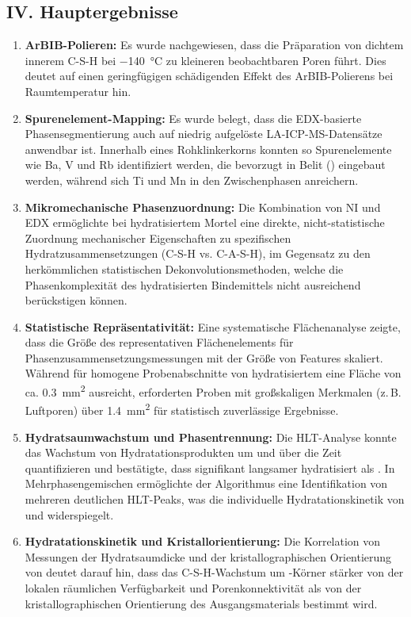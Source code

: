 \documentclass[11pt, a4paper]{article}
\begin{document}
\subsection*{IV. Hauptergebnisse}

\begin{enumerate}[label=\textbf{\arabic*.}, leftmargin=1.5cm, labelsep=0.5cm, itemsep=0.5em, resume]
    \item \textbf{ArBIB-Polieren:} Es wurde nachgewiesen, dass die Präparation von dichtem innerem C-S-H bei \qty{-140}{\celsius} zu kleineren beobachtbaren Poren führt.
    Dies deutet auf einen geringfügigen schädigenden Effekt des ArBIB-Polierens bei Raumtemperatur hin.
    \item \textbf{Spurenelement-Mapping:} Es wurde belegt, dass die EDX-basierte Phasensegmentierung auch auf niedrig aufgelöste LA-ICP-MS-Datensätze anwendbar ist.
    Innerhalb eines Rohklinkerkorns konnten so Spurenelemente wie Ba, V und Rb identifiziert werden, die bevorzugt in Belit () eingebaut werden, während sich Ti und Mn in den Zwischenphasen anreichern.
    \newpage
    \item \textbf{Mikromechanische Phasenzuordnung:} Die Kombination von NI und EDX ermöglichte bei hydratisiertem Mortel eine direkte, nicht-statistische Zuordnung mechanischer Eigenschaften zu spezifischen Hydratzusammensetzungen (C-S-H vs. C-A-S-H), im Gegensatz zu den herkömmlichen statistischen Dekonvolutionsmethoden, welche die Phasenkomplexität des hydratisierten Bindemittels nicht ausreichend berückstigen können.
    \item \textbf{Statistische Repräsentativität:} Eine systematische Flächenanalyse zeigte, dass die Größe des representativen Flächenelements für Phasenzusammensetzungsmessungen mit der Größe von Features skaliert. Während für homogene Probenabschnitte von hydratisiertem  eine Fläche von ca. \qty{0,3}{\milli\meter\squared} ausreicht, erforderten Proben mit großskaligen Merkmalen (z.\,B. Luftporen) über \qty{1,4}{\milli\meter\squared} für statistisch zuverlässige Ergebnisse.
    \item \textbf{Hydratsaumwachstum und Phasentrennung:} Die HLT-Analyse konnte das Wachstum von Hydratationsprodukten um  und  über die Zeit quantifizieren und bestätigte, dass  signifikant langsamer hydratisiert als .
    In Mehrphasengemischen ermöglichte der Algorithmus eine Identifikation von mehreren deutlichen HLT-Peaks, was die individuelle Hydratationskinetik von  und  widerspiegelt.
    \item \textbf{Hydratationskinetik und Kristallorientierung:} Die Korrelation von Messungen der Hydratsaumdicke und der kristallographischen Orientierung von  deutet darauf hin, dass das C-S-H-Wachstum um -Körner stärker von der lokalen räumlichen Verfügbarkeit und Porenkonnektivität als von der kristallographischen Orientierung des Ausgangsmaterials  bestimmt wird.

\end{enumerate}
\end{document}
